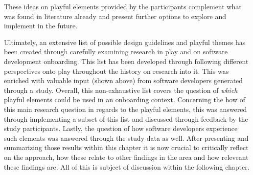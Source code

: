 These ideas on playful elements provided by the participants complement what was found in literature already and present further options to explore and implement in the future.

Ultimately, an extensive list of possible design guidelines and playful themes has been created through carefully examining research in play and on software development onboarding. This list has been developed through following different perspectives onto play throughout the history on research into it. This was enriched with valuable input (shown above) from software developers generated through a study. Overall, this non-exhaustive list covers the question of \textit{which} playful elements could be used in an onboarding context. Concerning the how of this main research question in regards to the playful elements, this was answered through implementing a subset of this list and discussed through feedback by the study participants. Lastly, the question of how software developers experience such elements was answered through the study data as well. After presenting and summarizing those results within this chapter it is now crucial to critically reflect on the approach, how these relate to other findings in the area and how releveant these findings are. All of this is subject of discussion within the following chapter.